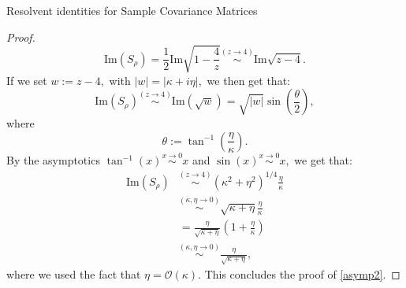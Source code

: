 \documentclass[11pt, a4paper, oneside]{book}
\numberwithin{equation}{chapter}
\begin{document}
\begin{section}{Resolvent identities for Sample Covariance Matrices}
\begin{proof}
    \[
    \mathrm{Im} ( S_{\rho} ) = \frac{1}{2} \mathrm{Im} \sqrt{1 - \frac{4}{z}} \overset{(z \to 4)}{\sim} \mathrm{Im} \sqrt{z-4}.
    \]
    If we set $w:= z-4,$ with $|w|=|\kappa+i\eta|,$ we then get that:
    \[
    \mathrm{Im} ( S_{\rho} ) \overset{(z \to 4)}{\sim} \mathrm{Im} ( \sqrt{w} ) = \sqrt{|w|} \sin \left (\frac{\theta}{2} \right ),
    \]
    where \[
    \theta := \tan^{-1} \left ( \frac{\eta}{\kappa} \right ).
    \]
    By the asymptotics $\tan^{-1}(x) \overset{x \to 0}{\sim} x$ and $\sin(x) \overset{x \to 0}{\sim} x,$ we get that:
    \begin{align*}
    \mathrm{Im} ( S_{\rho} ) &\overset{(z \to 4)}{\sim} (\kappa^2 + \eta^2)^{1/4} \frac{\eta}{\kappa} \\ 
    &\overset{(\kappa, \eta \to 0)}{\sim} \sqrt{\kappa + \eta} \frac{\eta}{\kappa} \\
    &= \frac{\eta}{\sqrt{\kappa+\eta}} \left ( 1 + \frac{\eta}{\kappa} \right ) \\
    &\overset{(\kappa, \eta \to 0)}{\sim} \frac{\eta}{\sqrt{\kappa+\eta}},
     \end{align*}
     where we used the fact that $\eta = \mathcal{O}(\kappa).$ This concludes the proof of \eqref{asymp2}.
\end{proof}
%
\end{section}
\end{document}
